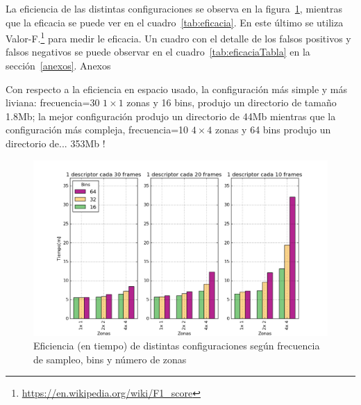 \documentclass[14pt,letterpaper,hidelinks]{extarticle}
\begin{document}
La eficiencia de las distintas configuraciones se observa en la figura~\ref{fig:experimentos}, mientras que la eficacia se puede ver en el cuadro~\ref{tab:eficacia}. En este último se utiliza Valor-F.\footnote{\url{https://en.wikipedia.org/wiki/F1_score}} para medir le eficacia. Un cuadro con el detalle de los falsos positivos y falsos negativos se puede observar en el cuadro~\ref{tab:eficaciaTabla} en la sección~\ref{anexos}. Anexos

Con respecto a la eficiencia en espacio usado, la configuración más simple y más liviana: frecuencia=30 $1\times1$ zonas y 16 bins, produjo un directorio de tamaño 1.8Mb; la mejor configuración produjo un directorio de 44Mb mientras que la configuración más compleja, frecuencia=10 $4\times4$ zonas y 64 bins produjo un directorio de... 353Mb !

\begin{figure}[ht!]
\centering 
\captionsetup{justification=centering,margin=2cm}
\includegraphics[scale=0.6]{img/experimentos.png}
\caption{Eficiencia (en tiempo) de distintas configuraciones según frecuencia de sampleo, bins y número de zonas\label{fig:experimentos}}
\end{figure} 
\end{document}
